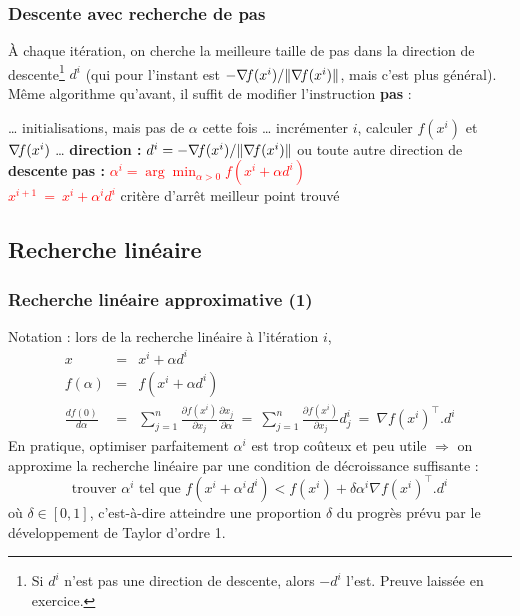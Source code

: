 \documentclass[12pt]{beamer}
\begin{document}
\begin{frame}
\frametitle{Descente avec recherche de pas} 
\vspace{-0.5cm}
À chaque itération, on cherche la meilleure taille de pas dans la direction de descente\footnote{Si $d^i$ n’est pas une direction de descente, alors $-d^i$ l’est. Preuve laissée en exercice.} $d^i$ (qui pour l’instant est $-\nabla\!{f}(x^i)/\lVert \nabla\!{f}(x^i) \rVert$, mais c’est plus général).\\ 
Même algorithme qu’avant, il suffit de modifier l’instruction \textbf{pas} :
\begin{block}{}
\begin{algorithmic}
\REQUIRE \ldots
\STATE initialisations, mais pas de $\alpha$ cette fois \ldots
\REPEAT
\STATE incrémenter $i$, calculer $f(x^i)$ et $\nabla\!{f}(x^i)$ \ldots
\STATE \textbf{direction : } $d^i = - \nabla\!{f}(x^i) / \lVert \nabla\!{f}(x^i) \rVert$ ou toute autre direction de \textbf{descente}
\STATE \textbf{pas : } \textcolor{red}{$\alpha^{i} = \arg \min_{\alpha > 0} f(x^i+\alpha d^i)$ \\
\hspace{1.5cm}$x^{i+1} ~=~ x^i + \alpha^i d^i$
} %
\UNTIL critère d’arrêt
\RETURN meilleur point trouvé
\end{algorithmic}
\end{block}
\end{frame}

\subsection{Recherche linéaire}


\begin{frame}
\frametitle{Recherche linéaire approximative (1)} 
Notation : lors de la recherche linéaire à l’itération $i$, 
\begin{eqnarray*}
x &=& x^i + \alpha d^i \\
f(\alpha) &=& f(x^i + \alpha d^i) \\
\frac{df(0)}{d\alpha} &=& \sum_{j=1}^n \frac{\partial f(x^i)}{\partial x_j} \frac{\partial x_j}{\partial \alpha}
~=~\sum_{j=1}^n \frac{\partial f(x^i)}{\partial x_j} d^i_j
~=~ \nabla f(x^i)^\top . d^i
\end{eqnarray*}
En pratique, optimiser parfaitement $\alpha^i$ est trop coûteux et peu utile 
$\Rightarrow$ on approxime la recherche linéaire par une condition de décroissance suffisante :
\begin{equation*}
\text{trouver } \alpha^i \text{ tel que } f(x^i + \alpha^i d^i) < f(x^i) + \delta \alpha^i \nabla f(x^i)^\top . d^i
\end{equation*}
où $\delta \in [0,1]$, c’est-à-dire atteindre une proportion $\delta$ du progrès prévu par le développement de Taylor d’ordre 1.
\end{frame}
\end{document}
